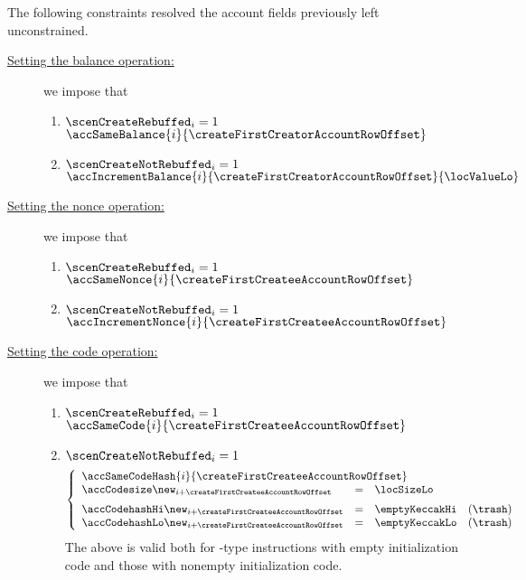 \noindent The following constraints resolved the account fields previously left unconstrained.
\begin{description}
	\item[\underline{Setting the balance operation:}]
		we impose that
		\begin{enumerate}
			\item \If $\scenCreateRebuffed    _{i} = 1$ \Then $\accSameBalance {i}{\createFirstCreatorAccountRowOffset}$
			\item \If $\scenCreateNotRebuffed _{i} = 1$ \Then $\accIncrementBalance {i}{\createFirstCreatorAccountRowOffset}{\locValueLo}$
		\end{enumerate}
	\item[\underline{Setting the nonce operation:}]
		we impose that
		\begin{enumerate}
			\item \If $\scenCreateRebuffed    _{i} = 1$ \Then $\accSameNonce      {i}{\createFirstCreateeAccountRowOffset}$
			\item \If $\scenCreateNotRebuffed _{i} = 1$ \Then $\accIncrementNonce {i}{\createFirstCreateeAccountRowOffset}$
		\end{enumerate}
	\item[\underline{Setting the code operation:}]
		we impose that
		\begin{enumerate}
			\item \If $\scenCreateRebuffed    _{i} = 1$ \Then $\accSameCode       {i}{\createFirstCreateeAccountRowOffset}$
			\item \If $\scenCreateNotRebuffed _{i} = 1$ \Then
				\[
					\left\{ \begin{array}{lclr}
						\multicolumn{3}{l}{\accSameCodeHash {i}{\createFirstCreateeAccountRowOffset}}                 \\
						\accCodesize\new _{i + \createFirstCreateeAccountRowOffset}   & = & \locSizeLo      \vspace{2mm} \\
						\accCodehashHi\new _{i + \createFirstCreateeAccountRowOffset} & = & \emptyKeccakHi                & (\trash) \\
						\accCodehashLo\new _{i + \createFirstCreateeAccountRowOffset} & = & \emptyKeccakLo                & (\trash) \\
					\end{array} \right.
				\]
				\saNote{}
				The above is valid both for -type instructions with empty initialization code and those with nonempty initialization code.

\end{enumerate}
\end{description}
